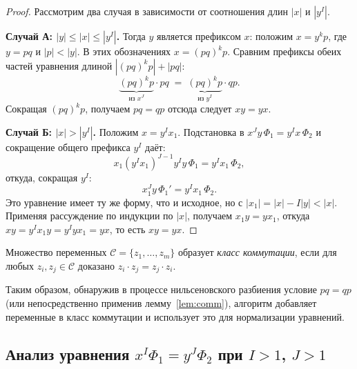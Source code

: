 \documentclass[14pt, russian]{scrartcl}
\begin{document}
\begin{proof}
Рассмотрим два случая в зависимости от соотношения длин $|x|$ и $|y^I|$.

\medskip\noindent\textbf{Случай А: $|y| \leq |x| \leq |y^I|$.}
Тогда $y$ является префиксом $x$: положим $x = y^k p$, где $y = pq$ и $|p| < |y|$.
В этих обозначениях $x = (pq)^k p$. Сравним префиксы обеих частей уравнения длиной
$|(pq)^k p| + |pq|$:
\[
  \underbrace{(pq)^k p}_{\text{из }x^J}\cdot pq
  \;=\;
  \underbrace{(pq)^k p}_{\text{из }y^I}\cdot qp.
\]
Сокращая $(pq)^k p$, получаем $pq = qp$  отсюда следует $xy = yx$.

\medskip\noindent\textbf{Случай Б: $|x| > |y^I|$.}
Положим $x = y^I x_1$. Подстановка в $x^J y\, \Phi_1 = y^I x\, \Phi_2$ и сокращение
общего префикса $y^I$ даёт:
\[
  x_1 (y^I x_1)^{J-1} y^I y\, \Phi_1 = y^I x_1\, \Phi_2,
\]
откуда, сокращая $y^I$:
\[
  x_1^J y\, \Phi_1' = y^I x_1\, \Phi_2.
\]
Это уравнение имеет ту же форму, что и исходное, но с $|x_1| = |x| - I|y| < |x|$.
Применяя рассуждение по индукции по $|x|$, получаем $x_1 y = y x_1$, откуда
$xy = y^I x_1 y = y^I y x_1 = y x$, то есть $xy = yx$.
\end{proof}

\begin{Definition}
Множество переменных $\mathcal{C} = \{z_1, \ldots, z_m\}$ образует
\emph{класс коммутации}, если для любых $z_i, z_j \in \mathcal{C}$ доказано
$z_i \cdot z_j = z_j \cdot z_i$.
\end{Definition}

Таким образом, обнаружив в процессе нильсеновского разбиения условие $pq = qp$
(или непосредственно применив лемму~\ref{lem:comm}), алгоритм добавляет переменные
в класс коммутации и использует это для нормализации уравнений.

\subsection{Анализ уравнения $x^I \Phi_1 = y^J \Phi_2$ при $I>1$, $J>1$}
\end{document}
